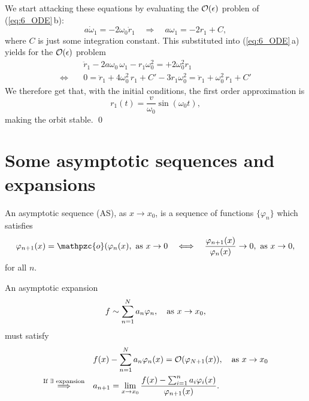 \documentclass[11pt,letter, swedish, english
]{article}
\newcommand{\oh}{\ensuremath\mathpzc{o}}
\begin{document}
We start attacking these equations by evaluating the
$\order{\epsilon}$ problen of (\ref{eq:6_ODE}\,b):
\begin{equation}
a\dot{\omega}_1=-2\omega_0\dot{r}_1 \quad\Longrightarrow\quad
a\omega_1 = -2r_1 + C,
\end{equation}
where $C$ is just some integration constant. This substituted into 
(\ref{eq:6_ODE}\,a) yields for the $\order{\epsilon}$
problem\footnotemark{} 
\begin{equation}
\begin{aligned}
&\ddot{r}_1 - 2a\omega_0\,\omega_1 - r_1\omega_0^2 = +2\omega_0^2r_1\\
\Longleftrightarrow\quad&
0=\ddot{r}_1 + 4\omega_0^2\,r_1 +C' - 3r_1\omega_0^2 = \ddot{r}_1 +
\omega_0^2\,r_1 +C'
\end{aligned}
\end{equation}
We therefore get that, with the initial conditions, the first order
approximation is
\begin{equation}
r_1(t) = \frac{v}{\omega_0}\sin(\omega_0t),
\end{equation}
making the orbit stable.
\qed
{}


\section{Some asymptotic sequences and expansions}
\newcommand{\as}{\qcomma\text{as }}
An asymptotic sequence (AS), as $x\to x_0$, is a sequence of functions
$\{\varphi_n\}$ which satisfies
\begin{equation}\label{eq:AS}
\varphi_{n+1}(x) = \oh(\varphi_{n}(x), \text{ as } x\to0
\quad\Longleftrightarrow\quad
\frac{\varphi_{n+1}(x)}{\varphi_{n}(x)}\to0 , \text{ as } x\to0,
\end{equation}
for all $n$.

An asymptotic expansion
\begin{equation}
f\sim\sum_{n=1}^N a_n\varphi_n\as x\to x_0,
\end{equation}
must satisfy
\begin{align}
&f(x)-\sum_{n=1}^Na_n\varphi_n(x)=\order{\varphi_{N+1}(x)}\as x\to x_0
\\ \label{eq:7_AE_coef}
\stackrel{\text{If }\exists\text{ expansion}}{\Longrightarrow}\quad
& a_{n+1} = \lim_{x\to x_0} 
\frac{f(x)-\sum_{i=1}^{n}a_i\varphi_i(x)}{\varphi_{n+1}(x)}.
\end{align}
\end{document}
